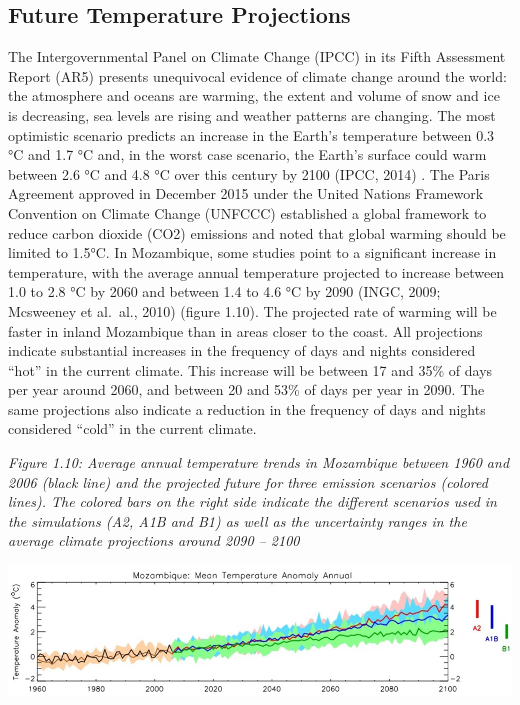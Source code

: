 \documentclass[
]{book}
\begin{document}
\hypertarget{future-temperature-projections}{%
\subsection{Future Temperature Projections}\label{future-temperature-projections}}

The Intergovernmental Panel on Climate Change (IPCC) in its Fifth Assessment Report (AR5) presents unequivocal evidence of climate change around the world: the atmosphere and oceans are warming, the extent and volume of snow and ice is decreasing, sea levels are rising and weather patterns are changing. The most optimistic scenario predicts an increase in the Earth's temperature between 0.3 °C and 1.7 °C and, in the worst case scenario, the Earth's surface could warm between 2.6 °C and 4.8 °C over this century by 2100 (IPCC, 2014) . The Paris Agreement approved in December 2015 under the United Nations Framework Convention on Climate Change (UNFCCC) established a global framework to reduce carbon dioxide (CO2) emissions and noted that global warming should be limited to 1.5°C.
In Mozambique, some studies point to a significant increase in temperature, with the average annual temperature projected to increase between 1.0 to 2.8 °C by 2060 and between 1.4 to 4.6 °C by 2090 (INGC, 2009; Mcsweeney et al.~al., 2010) (figure 1.10). The projected rate of warming will be faster in inland Mozambique than in areas closer to the coast. All projections indicate substantial increases in the frequency of days and nights considered ``hot'' in the current climate. This increase will be between 17 and 35\% of days per year around 2060, and between 20 and 53\% of days per year in 2090. The same projections also indicate a reduction in the frequency of days and nights considered ``cold'' in the current climate.

\emph{Figure 1.10: Average annual temperature trends in Mozambique between 1960 and 2006 (black line) and the projected future for three emission scenarios (colored lines). The colored bars on the right side indicate the different scenarios used in the simulations (A2, A1B and B1) as well as the uncertainty ranges in the average climate projections around 2090 -- 2100}

\includegraphics{Figure18.png}
\end{document}
